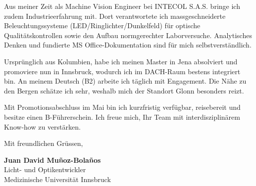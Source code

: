\documentclass[11pt,a4paper]{article}
\begin{document}
Aus meiner Zeit als Machine Vision Engineer bei INTECOL S.A.S. bringe ich zudem Industrieerfahrung mit. Dort verantwortete ich massgeschneiderte Beleuchtungssysteme (LED/Ringlichter/Dunkelfeld) für optische Qualitätskontrollen sowie den Aufbau normgerechter Laborversuche. Analytisches Denken und fundierte MS Office-Dokumentation sind für mich selbstverständlich.



Ursprünglich aus Kolumbien, habe ich meinen Master in Jena absolviert und promoviere nun in Innsbruck, wodurch ich im DACH-Raum bestens integriert bin. An meinem Deutsch (B2) arbeite ich täglich mit Engagement. Die Nähe zu den Bergen schätze ich sehr, weshalb mich der Standort Glonn besonders reizt.



Mit Promotionsabschluss im Mai bin ich kurzfristig verfügbar, reisebereit und besitze einen B-Führerschein. Ich freue mich, Ihr Team mit interdisziplinärem Know-how zu verstärken.




\vspace{12pt}

Mit freundlichen Grüssen,

\vspace{8pt}

\textbf{Juan David Muñoz-Bolaños} \\
Licht- und Optikentwickler \\
Medizinische Universität Innsbruck
\end{document}
